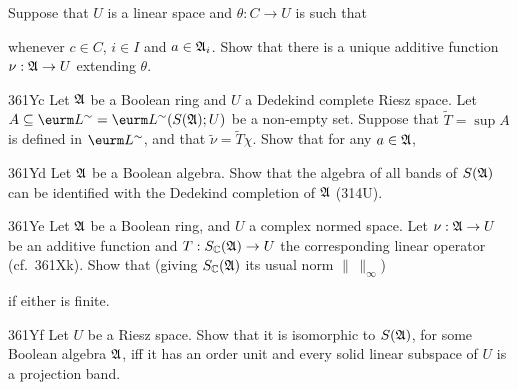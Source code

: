 {

\noindent Suppose that $U$ is a linear space and $\theta:C\to U$ is such
that


\noindent whenever $c\in C$, $i\in I$ and $a\in\frak A_i$.
Show that there is a unique additive function $\nu:\frak A\to U$ extending
$\theta$.   

\spheader 361Yc Let $\frak A$ be a Boolean ring and $U$ a Dedekind
complete Riesz space.   Let
$A\subseteq\eurm L^{\sim}=\eurm L^{\sim}(S(\frak A);U)$ be a non-empty set.   Suppose that
$\tilde T=\sup A$ is defined in $\eurm L^{\sim}$, and that $\tilde\nu=\tilde T\chi$.   Show that for any $a\in\frak A$,


\spheader 361Yd Let $\frak A$ be a Boolean algebra.   Show that the
algebra of all bands of $S(\frak A)$ can be identified with the Dedekind
completion of $\frak A$ (314U).

\spheader 361Ye Let $\frak A$ be a Boolean ring, and $U$ a complex
normed space.   Let $\nu:\frak A\to U$ be an additive function and
$T:S_{\Bbb C}(\frak A)\to U$ the corresponding linear operator (cf.\ 361Xk).   Show
that (giving $S_{\Bbb C}(\frak A)$ its usual norm $\|\,\|_{\infty}$)


\noindent if either is finite.

\spheader 361Yf Let $U$ be a Riesz space.   Show that it is isomorphic
to $S(\frak A)$, for some Boolean algebra $\frak A$, iff it has an order
unit and every solid linear subspace of $U$ is a projection band.
}%

